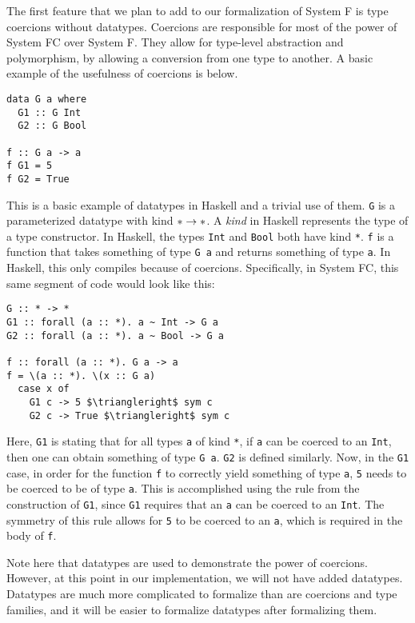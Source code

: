 \documentclass{sig-alternate}
\begin{document}
The first feature that we plan to add to our formalization of System F is type coercions without datatypes.  Coercions are responsible for most of the power of System FC over System F.  They allow for type-level abstraction and polymorphism, by allowing a conversion from one type to another. A basic example of the usefulness of coercions is below.
\begin{verbatim}
data G a where
  G1 :: G Int
  G2 :: G Bool

f :: G a -> a
f G1 = 5
f G2 = True
\end{verbatim}
This is a basic example of datatypes in Haskell and a trivial use of them. \texttt{G} is a parameterized datatype with kind ${\tt *}\rightarrow{\tt *}$. A \textit{kind} in Haskell represents the type of a type constructor. In Haskell, the types \texttt{Int} and \texttt{Bool} both have kind \texttt{*}. \texttt{f} is a function that takes something of type \texttt{G a} and returns something of type \texttt{a}. In Haskell, this only compiles because of coercions. Specifically, in System FC, this same segment of code would look like this:
\begin{lstlisting}
G :: * -> *
G1 :: forall (a :: *). a ~ Int -> G a
G2 :: forall (a :: *). a ~ Bool -> G a

f :: forall (a :: *). G a -> a
f = \(a :: *). \(x :: G a)
  case x of
    G1 c -> 5 $\triangleright$ sym c
    G2 c -> True $\triangleright$ sym c
\end{lstlisting}
Here, \texttt{G1} is stating that for all types \texttt{a} of kind \texttt{*}, if \texttt{a} can be coerced to an \texttt{Int}, then one can obtain something of type \texttt{G a}. \texttt{G2} is defined similarly. Now, in the \texttt{G1} case, in order for the function \texttt{f} to correctly yield something of type \texttt{a}, \texttt{5} needs to be coerced to be of type \texttt{a}. This is accomplished using the rule from the construction of \texttt{G1}, since \texttt{G1} requires that an \texttt{a} can be coerced to an \texttt{Int}. The symmetry of this rule allows for \texttt{5} to be coerced to an \texttt{a}, which is required in the body of \texttt{f}. 

Note here that datatypes are used to demonstrate the power of coercions. However, at this point in our implementation, we will not have added datatypes. Datatypes are much more complicated to formalize than are coercions and type families, and it will be easier to formalize datatypes after formalizing them.

\end{document}
